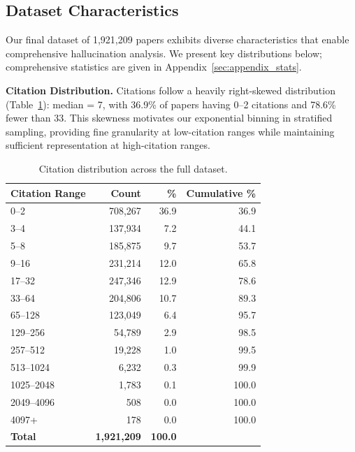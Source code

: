 \documentclass[11pt]{article}
\begin{document}
\subsection{Dataset Characteristics}

Our final dataset of 1,921,209 papers exhibits diverse characteristics that enable comprehensive hallucination analysis. We present key distributions below; comprehensive statistics
are given in Appendix~\ref{sec:appendix_stats}.

\textbf{Citation Distribution.}
Citations follow a heavily right-skewed distribution
(Table~\ref{tab:citations}): median = 7, with 36.9\% of papers having 0--2 citations and 78.6\% fewer than 33. This skewness motivates our exponential binning in stratified sampling, providing fine granularity at low-citation ranges while maintaining sufficient representation at high-citation ranges.

\setlength{\tabcolsep}{4pt}
\begin{table}[tb!]
  \centering
  \captionsetup{font=small}
  \footnotesize
  \begin{tabular}{@{}lrrr@{}}
    \toprule
    \textbf{Citation Range} & \textbf{Count} & \% & \textbf{Cumulative} \% \\
    \midrule
    0--2 & 708,267 & 36.9 & 36.9 \\
    3--4 & 137,934 & 7.2 & 44.1 \\
    5--8 & 185,875 & 9.7 & 53.7 \\
    9--16 & 231,214 & 12.0 & 65.8 \\
    17--32 & 247,346 & 12.9 & 78.6 \\
    33--64 & 204,806 & 10.7 & 89.3 \\
    65--128 & 123,049 & 6.4 & 95.7 \\
    129--256 & 54,789 & 2.9 & 98.5 \\
    257--512 & 19,228 & 1.0 & 99.5 \\
    513--1024 & 6,232 & 0.3 & 99.9 \\
    1025--2048 & 1,783 & 0.1 & 100.0 \\
    2049--4096 & 508 & 0.0 & 100.0 \\
    4097+ & 178 & 0.0 & 100.0 \\
    \midrule
    \textbf{Total} & \textbf{1,921,209} & \textbf{100.0} & \\
    \bottomrule
  \end{tabular}
    \caption{Citation distribution across the full dataset.}
      \label{tab:citations}
\end{table}
\end{document}
